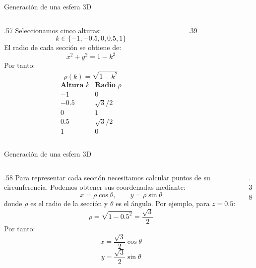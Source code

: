 \documentclass[main.tex]{subfiles}
\begin{document}
\begin{frame}{Generación de una esfera 3D}
\begin{columns}[c]
\begin{column}{.57\textwidth}
Seleccionamos cinco alturas:
\[k\in\{-1,-0.5,0,0.5,1\}\]
El radio de cada sección se obtiene de:
\[x^2+y^2=1-k^2\]
Por tanto:
\[\rho(k)=\sqrt{1-k^2}\]
\medskip
\[
\begin{array}{c|c}
\textbf{Altura }k & \textbf{Radio }\rho\\ \hline
-1 & 0\\
-0.5 & \sqrt{3}/2\\
0 & 1\\
0.5 & \sqrt{3}/2\\
1 & 0
\end{array}
\]
\end{column}
\begin{column}{.39\textwidth}
\centering
{}
\end{column}
\end{columns}
\end{frame}

\begin{frame}{Generación de una esfera 3D}
\begin{columns}[c]
\begin{column}{.58\textwidth}
Para representar cada sección necesitamos calcular puntos de su circunferencia.
\medskip
Podemos obtener sus coordenadas mediante:
\[x=\rho\cos\theta,\qquad y=\rho\sin\theta\]
donde $\rho$ es el radio de la sección y $\theta$ es el ángulo.
\medskip
Por ejemplo, para $z=0.5$:
\[\rho=\sqrt{1-0.5^2}=\frac{\sqrt{3}}{2}\]
Por tanto:
\[x=\frac{\sqrt{3}}{2}\cos\theta\]
\[y=\frac{\sqrt{3}}{2}\sin\theta\]
\end{column}
\begin{column}{.38\textwidth}
\centering
{}
\end{column}
\end{columns}
\end{frame}
\end{document}
